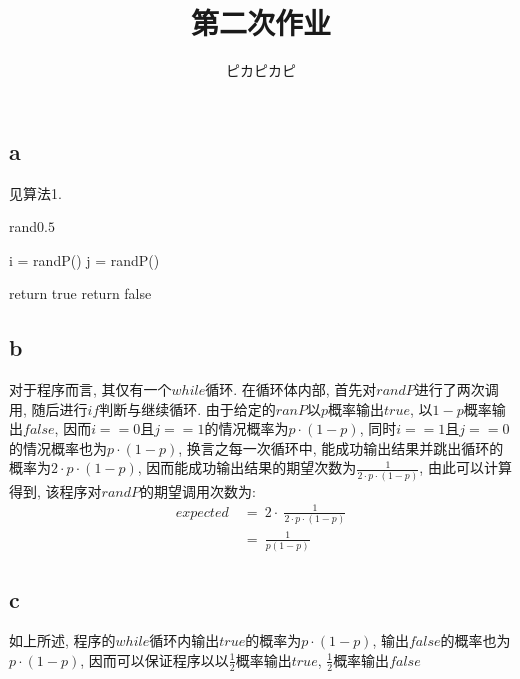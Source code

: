 \documentclass{article}
\begin{document}
 
 
 
\title{第二次作业}
\author{ピカピカピ}
 
\maketitle

\section{}
\subsection{a}
见算法1.
\begin{algorithm}
\caption{rand$0.5$}
\begin{algorithmic}[1]
\State i = randP()
\State j = randP()

\State return true
\State return false
\EndIf
\EndWhile
\EndProcedure
\end{algorithmic}
\end{algorithm}

\subsection{b}

对于程序而言, 其仅有一个$while$循环. 在循环体内部, 首先对$randP$进行了两次调用, 随后进行$if$判断与继续循环. 由于给定的$ranP$以$p$概率输出$true$, 以$1-p$概率输出$false$, 因而$i == 0$且$j == 1$的情况概率为$p \cdot (1-p)$, 同时$i == 1$且$j == 0$的情况概率也为$p \cdot (1-p)$, 换言之每一次循环中, 能成功输出结果并跳出循环的概率为$2 \cdot p \cdot (1-p)$, 因而能成功输出结果的期望次数为$\frac{1}{2 \cdot p \cdot (1-p)}$, 由此可以计算得到, 该程序对$randP$的期望调用次数为:
\begin{align*}
expected\ &=\ 2 \cdot \ \frac{1}{2 \cdot p \cdot (1-p)} \\
&=\ \frac{1}{p(1-p)}
\end{align*}

\subsection{c}
如上所述, 程序的$while$循环内输出$true$的概率为$p \cdot (1-p)$, 输出$false$的概率也为$p \cdot (1-p)$, 因而可以保证程序以以$\frac{1}{2}$概率输出$true$, $\frac{1}{2}$概率输出$false$
\end{document}
